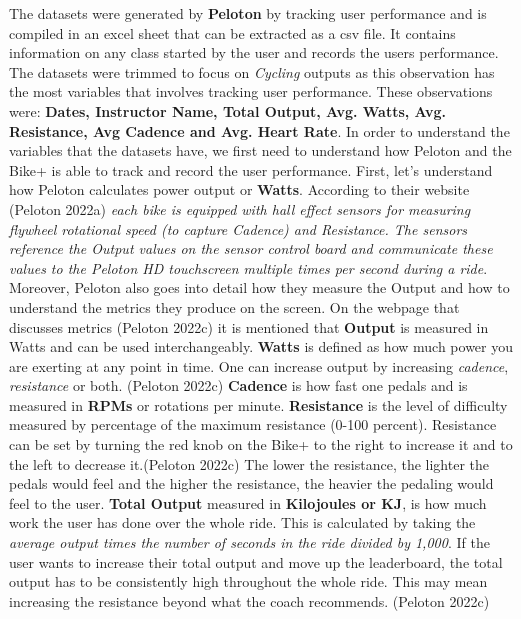\documentclass[
]{article}
\begin{document}
The datasets were generated by \textbf{Peloton} by tracking user performance and is compiled in an excel sheet that can be extracted as a csv file. It contains information on any class started by the user and records the users performance. The datasets were trimmed to focus on \emph{Cycling} outputs as this observation has the most variables that involves tracking user performance. These observations were: \textbf{Dates, Instructor Name, Total Output, Avg. Watts, Avg. Resistance, Avg Cadence and Avg. Heart Rate}. In order to understand the variables that the datasets have, we first need to understand how Peloton and the Bike+ is able to track and record the user performance. First, let's understand how Peloton calculates power output or \textbf{Watts}. According to their website (Peloton 2022a) \emph{each bike is equipped with hall effect sensors for measuring flywheel rotational speed (to capture Cadence) and Resistance. The sensors reference the Output values on the sensor control board and communicate these values to the Peloton HD touchscreen multiple times per second during a ride}. Moreover, Peloton also goes into detail how they measure the Output and how to understand the metrics they produce on the screen. On the webpage that discusses metrics (Peloton 2022c) it is mentioned that \textbf{Output} is measured in Watts and can be used interchangeably. \textbf{Watts} is defined as how much power you are exerting at any point in time. One can increase output by increasing \emph{cadence}, \emph{resistance} or both. (Peloton 2022c) \textbf{Cadence} is how fast one pedals and is measured in \textbf{RPMs} or rotations per minute. \textbf{Resistance} is the level of difficulty measured by percentage of the maximum resistance (0-100 percent). Resistance can be set by turning the red knob on the Bike+ to the right to increase it and to the left to decrease it.(Peloton 2022c) The lower the resistance, the lighter the pedals would feel and the higher the resistance, the heavier the pedaling would feel to the user. \textbf{Total Output} measured in \textbf{Kilojoules or KJ}, is how much work the user has done over the whole ride. This is calculated by taking the \emph{average output times the number of seconds in the ride divided by 1,000}. If the user wants to increase their total output and move up the leaderboard, the total output has to be consistently high throughout the whole ride. This may mean increasing the resistance beyond what the coach recommends. (Peloton 2022c)
\end{document}
